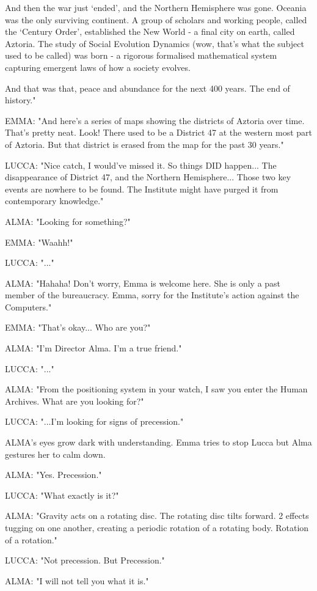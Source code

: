 \documentclass[11pt]{article}
\begin{document}
And then the war just `ended', and the Northern Hemisphere was gone.
Oceania was the only surviving continent.
A group of scholars and working people, called the `Century Order', established the New World - a final city on earth, called Aztoria.
The study of Social Evolution Dynamics (wow, that's what the subject used to be called) was born - a rigorous formalised mathematical system capturing emergent laws of how a society evolves.

And that was that, peace and abundance for the next 400 years. 
The end of history."

EMMA: "And here's a series of maps showing the districts of Aztoria over time. 
That's pretty neat.
Look! There used to be a District 47 at the western most part of Aztoria.
But that district is erased from the map for the past 30 years."

LUCCA: "Nice catch, I would've missed it. 
So things DID happen...
The disappearance of District 47, and the Northern Hemisphere...
Those two key events are nowhere to be found.
The Institute might have purged it from contemporary knowledge."

ALMA: "Looking for something?"

EMMA: "Waahh!"

LUCCA: "..."

ALMA: "Hahaha! Don't worry, Emma is welcome here.
She is only a past member of the bureaucracy. 
Emma, sorry for the Institute's action against the Computers."

EMMA: "That's okay... Who are you?"

ALMA: "I'm Director Alma. 
I'm a true friend."

LUCCA: "..."

ALMA: "From the positioning system in your watch, I saw you enter the Human Archives.
What are you looking for?"

LUCCA: "...I'm looking for signs of precession."

ALMA's eyes grow dark with understanding.
Emma tries to stop Lucca but Alma gestures her to calm down.

ALMA: "Yes. Precession."

LUCCA: "What exactly is it?"

ALMA: "Gravity acts on a rotating disc. The rotating disc tilts forward. 2 effects tugging on one another, creating a periodic rotation of a rotating body.
Rotation of a rotation."

LUCCA: "Not precession. But Precession."

ALMA: "I will not tell you what it is."
\end{document}
